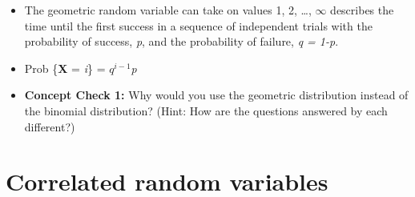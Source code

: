 \documentclass[12pt]{report}
\begin{document}
\begin{itemize}

\item The geometric random variable can take on values 1, 2, \ldots, $\infty$ describes the time until the first success in a sequence of independent trials with the probability of success, \textit{p}, and the probability of failure, \textit{q = 1-p}. 

\item Prob \{\textbf{X} = \textit{i}\} = \textit{$q^{i-1}$}\textit{p}

\item \textbf{Concept Check 1:} Why would you use the geometric distribution instead of the binomial distribution? (Hint: How are the questions answered by each different?) 

\end{itemize}

\bigskip

\bigskip

\bigskip

\section{Correlated random variables}
\end{document}
